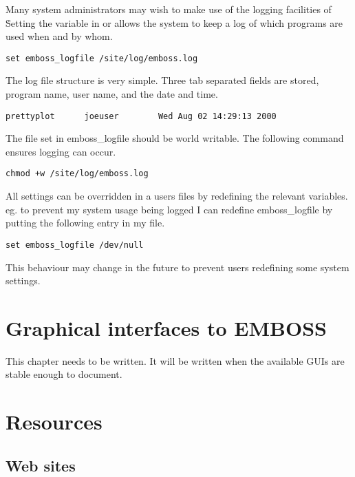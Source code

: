 \documentclass{report}
\begin{document}
Many system administrators may wish to make use of the logging facilities of \EMBOSS\. Setting the variable  in  or  allows the system to keep a log of which programs are used when and by whom.
\begin{verbatim}
set emboss_logfile /site/log/emboss.log
\end{verbatim}
The log file structure is very simple. Three tab separated fields are stored, program name, user name, and the date and time.
\begin{verbatim}
prettyplot      joeuser        Wed Aug 02 14:29:13 2000
\end{verbatim}
The file set in emboss\_logfile should be world writable. The following command ensures logging can occur. 
\begin{verbatim}
chmod +w /site/log/emboss.log
\end{verbatim}

All settings can be overridden in a users  files by redefining the relevant variables. eg. to prevent my system usage being logged I can redefine emboss\_logfile by putting the following entry in my  file. 
\begin{verbatim}
set emboss_logfile /dev/null
\end{verbatim}
This behaviour may change in the future to prevent users redefining some system settings.

\chapter{Graphical interfaces to EMBOSS}

This chapter needs to be written. It will be written when the available GUIs are stable enough to document.

\chapter{Resources}
\section{Web sites}
\end{document}
